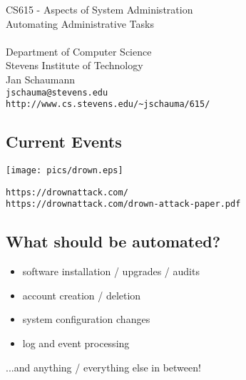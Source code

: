 \documentclass[xga]{xdvislides}
\begin{document}
\setfontphv

\lhead{\slidetitle}                               %
\cfoot{\relax}                               %
\rfoot{\Gray{\today}}

\vspace*{\fill}
\begin{center}
	\Hugesize
		CS615 - Aspects of System Administration\\ [1em]
		Automating Administrative Tasks \\ [1em]

	\hspace*{5mm}\blueline\\ [1em]
	\Normalsize
		Department of Computer Science\\
		Stevens Institute of Technology\\
		Jan Schaumann\\
		\verb+jschauma@stevens.edu+\\
		\verb+http://www.cs.stevens.edu/~jschauma/615/+
\end{center}
\vspace*{\fill}

\subsection{Current Events}
\vspace*{\fill}
\begin{center}
	\texttt{[image: pics/drown.eps]}
\begin{verbatim}
https://drownattack.com/
https://drownattack.com/drown-attack-paper.pdf
\end{verbatim}
\end{center}
\vspace*{\fill}


\subsection{What should be automated?}

\begin{itemize}
	\item software installation / upgrades / audits
	\item account creation / deletion
	\item system configuration changes
	\item log and event processing
\end{itemize}
\vspace{.5in}
...and anything / everything else in between!
\end{document}
